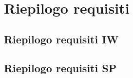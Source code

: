 \section{Riepilogo requisiti}
\subsection{Riepilogo requisiti IW}
\subsection{Riepilogo requisiti SP}